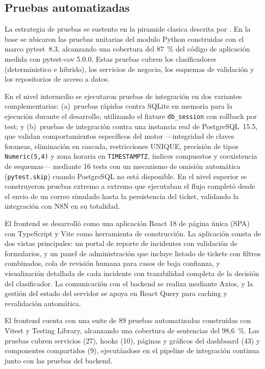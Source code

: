 \subsection{Pruebas automatizadas}

La estrategia de pruebas se sustento en la piramide clasica descrita por \textcite{Crispin2009_agile_testing}. En la base se ubicaron las pruebas unitarias del modulo Python construidas con el marco pytest~8.3, alcanzando una cobertura del 87~\% del código de aplicación medida con pytest-cov 5.0.0. Estas pruebas cubren los clasificadores (deterministico e hibrido), los servicios de negocio, los esquemas de validación y los repositorios de acceso a datos.

En el nivel intermedio se ejecutaron pruebas de integración en dos variantes complementarias: (a)~pruebas rápidas contra SQLite en memoria para la ejecución durante el desarrollo, utilizando el fixture \texttt{db\_session} con rollback por test; y (b)~pruebas de integración contra una instancia real de PostgreSQL~15.5, que validan comportamientos específicos del motor ---integridad de claves foraneas, eliminación en cascada, restricciones UNIQUE, precisión de tipos \texttt{Numeric(5,4)} y zona horaria en \texttt{TIMESTAMPTZ}, índices compuestos y coexistencia de esquemas--- mediante 16 tests con un mecanismo de omisión automática (\texttt{pytest.skip}) cuando PostgreSQL no está disponible. En el nivel superior se construyeron pruebas extremo a extremo que ejecutaban el flujo completó desde el envio de un correo simulado hasta la persistencia del ticket, validando la integración con N8N en su totalidad.

El frontend se desarrolló como una aplicación React 18 de página única (SPA) con TypeScript y Vite como herramienta de construcción. La aplicación consta de dos vistas principales: un portal de reporte de incidentes con validación de formularios, y un panel de administración que incluye listado de tickets con filtros combinados, cola de revisión humana para casos de baja confianza, y visualización detallada de cada incidente con trazabilidad completa de la decisión del clasificador. La comunicación con el backend se realiza mediante Axios, y la gestión del estado del servidor se apoya en React Query para caching y revalidación automática.

El frontend cuenta con una suite de 89 pruebas automatizadas construidas con Vitest y Testing Library, alcanzando una cobertura de sentencias del 98,6~\%. Las pruebas cubren servicios (27), hooks (10), páginas y gráficos del dashboard (43) y componentes compartidos (9), ejecutándose en el pipeline de integración continua junto con las pruebas del backend.

